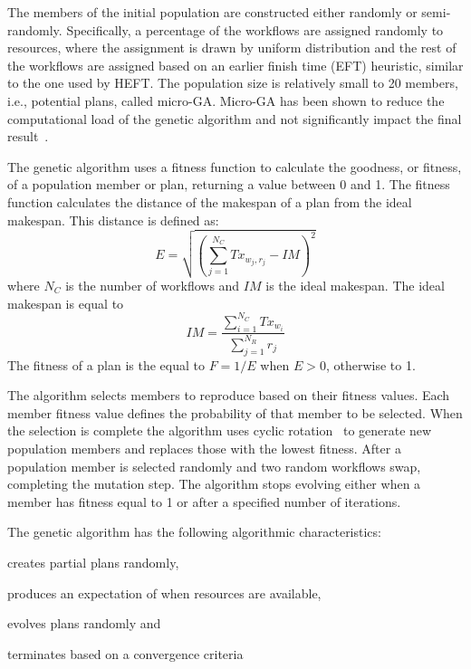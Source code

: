 The members of the initial population are constructed either randomly or semi-randomly.
Specifically, a percentage of the workflows are assigned randomly to resources, where the assignment is drawn by uniform distribution and the rest of the workflows are assigned based on an earlier finish time (EFT) heuristic, similar to the one used by HEFT.
The population size is relatively small to 20 members, i.e., potential plans, called micro-GA.
Micro-GA has been shown to reduce the computational load of the genetic algorithm and not significantly impact the final result~\cite{zomaya2001observations}.

The genetic algorithm uses a fitness function to calculate the goodness, or fitness, of a population member or plan, returning a value between 0 and 1.
The fitness function calculates the distance of the makespan of a plan from the ideal makespan.
This distance is defined as:
\begin{equation}
E = \sqrt{(\sum_{j=1}^{N_{C}}Tx_{w_{j},r_{j}} - IM)^2}
\label{eq:fitness}
\end{equation}
where $N_{C}$ is the number of workflows and $IM$ is the ideal makespan.
The ideal makespan is equal to
\begin{equation}
IM = \frac{\sum_{i=1}^{N_{C}}Tx_{w_{i}}}{\sum_{j=1}^{N_{R}}r_{j}}
\label{eq:ideal_fitness}
\end{equation}
The fitness of a plan is the equal to $F = 1 /E$ when $E > 0$, otherwise to 1.

The algorithm selects members to reproduce based on their fitness values.
Each member fitness value defines the probability of that member to be selected.
When the selection is complete the algorithm uses cyclic rotation~\cite{oliver1987study} to generate new population members and replaces those with the lowest fitness.
After a population member is selected randomly and two random workflows swap, completing the mutation step.
The algorithm stops evolving either when a member has fitness equal to 1 or after a specified number of iterations.

The genetic algorithm has the following algorithmic characteristics:
\begin{inparaenum}[1)]
    \item creates partial plans randomly,
    \item produces an expectation of when resources are available,
    \item evolves plans randomly and
    \item terminates based on a convergence criteria
\end{inparaenum}


